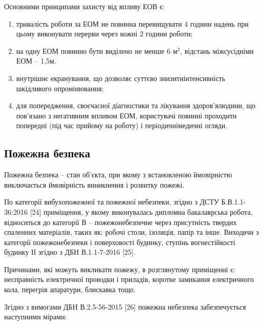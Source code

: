 Основними принципами захисту від впливу ЕОВ є:

\begin{enumerate}
	\item тривалість роботи за ЕОМ не повинна перевищувати 4 години на\newline \hspace*{-18mm}день при цьому виконувати перерви через кожні 2 години роботи;
	\item на одну ЕОМ повинно бути виділено не менше 6 $\text{м}^{2}$, відстань між\newline \hspace*{-18mm}сусідніми ЕОМ – 1,5м.
	\item внутрішнє екранування, що дозволяє суттєво знизити\newline \hspace*{-18mm}інтенсивність шкідливого опромінювання;
	\item для попередження, своєчасної діагностики та лікування здоров’я\newline \hspace*{-18mm}людини, що пов’язано з негативним впливом ЕОМ, користувачі повинні проходити попередні (під час прийому на роботу) і періодичні\newline \hspace*{-18mm}медичні огляди.
\end{enumerate}

\subsection{Пожежна безпека}

Пожежна безпека – стан об’єкта, при якому з встановленою ймовірністю виключається ймовірність виникнення і розвитку пожежі.

По категорії вибухопожежної та пожежної небезпеки, згідно з ДСТУ Б.В.1.1-36:2016 [24] приміщення, у якому виконувалась дипломна бакалаврська робота, відноситься до категорії В – пожежонебезпечне через присутність твердих спаленних матеріалів, таких як: робочі столи, ізоляція, папір та інше. Виходячи з категорії пожежонебезпеки і поверховості будинку, ступінь вогнестійкості будинку ІІ згідно з ДБН В.1.1-7-2016 [25].

Причинами, які можуть викликати пожежу, в розглянутому приміщенні є: несправність електричної проводки і приладів, коротке замикання електричного кола, перегрів апаратури, блискавка тощо.

Згідно з вимогами ДБН В.2.5-56-2015 [26] пожежна небезпека забезпечується наступними мірами:

